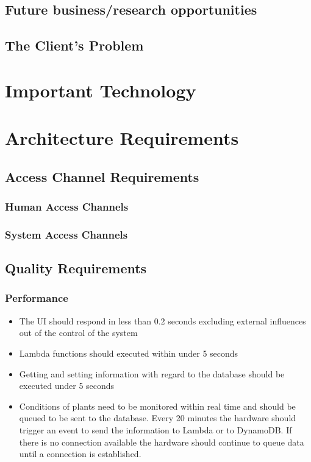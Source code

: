 \documentclass{article}
\begin{document}
\subsection{Future business/research opportunities}

\subsection{The Client's Problem}

\section{Important Technology}

\section{Architecture Requirements}

\subsection{Access Channel Requirements}

\subsubsection{Human Access Channels}

\subsubsection{System Access Channels}

	\subsection{Quality Requirements}
	
		\subsubsection{Performance}
			\begin{itemize}
				\item The UI should respond in less than 0.2 seconds excluding external influences out of the control of the system
				\item Lambda functions should executed within under 5 seconds
				\item Getting and setting information with regard to the database should be executed under 5 seconds
				\item Conditions of plants need to be monitored within real time and should be queued to be sent to the database. Every 20 minutes the hardware should trigger an event to send the information to Lambda or to DynamoDB. If there is no connection available the hardware should continue to queue data until a connection is established.
			\end{itemize}
\end{document}
